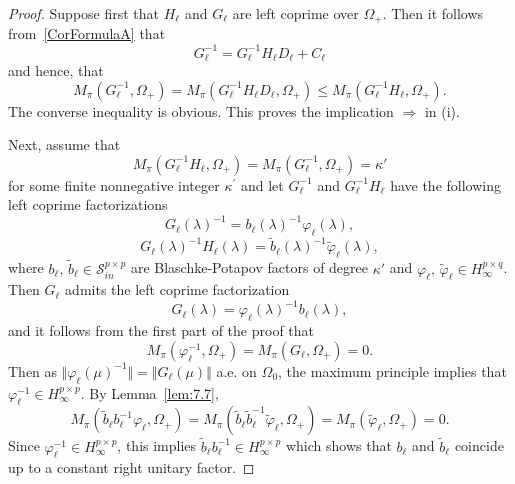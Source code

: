 \documentclass[12pt,twoside,a4paper]{amsart}
\theoremstyle{definition}
\numberwithin{equation}{section}
\begin{document}
\begin{proof}
Suppose first  that $H_\ell$ and $ G_\ell $ are left coprime over
$\Omega_+$. Then it follows from~\eqref{CorFormulaA} that
\[
G_\ell^{-1}= G_\ell^{-1} H_\ell D_\ell+ C_\ell
\]
and hence, that
\[
M_{\pi} (G_\ell^{-1}, \Omega_+)=M_\pi(G_\ell^{-1}H_\ell D_\ell, \Omega_+)\le M_{\pi}
(G_\ell^{-1}H_\ell, \Omega_+).
\]
The converse inequality is obvious. This proves the implication
$\Longrightarrow$ in (i).

Next, assume that
\[
M_{\pi} (G_\ell^{-1}H_\ell, \Omega_+)=M_{\pi} (G_\ell^{-1},
\Omega_+)=\kappa'
\]
for some finite nonnegative integer $\kappa^\prime$ and
let $ G_\ell^{-1}$ and $ G_\ell^{-1} H_\ell$ have the
following left coprime factorizations
\begin{equation}\label{eq:7.110a}
 G_\ell (\lambda)^{-1}=b_\ell(\lambda)^{-1}\varphi_\ell(\lambda),
\end{equation}
\begin{equation}\label{eq:7.110b}
 G_\ell (\lambda)^{-1}H_\ell(\lambda) ={{{\widetilde b} }}_\ell(\lambda)^{-1}{{{\widetilde \varphi} }}_\ell(\lambda),
\end{equation}
where $b_\ell,\,{{{\widetilde b} }}_\ell \in {\mathcal S}_{in}^{p\times p}$ are
Blaschke-Potapov factors of degree $\kappa'$ and $\varphi_\ell,\,
{{{\widetilde \varphi} }}_\ell \in H_{\infty}^{p\times q}$. Then $G_\ell$ admits
the left coprime factorization
\begin{equation}\label{eq:7.110c}
 G_\ell (\lambda)= \varphi_\ell (\lambda)^{-1}b_\ell(\lambda) ,
\end{equation}
and it follows from the first part of the proof that
\[
M_{\pi} (\varphi_\ell^{-1}, \Omega_+)=M_{\pi} (G_\ell,
\Omega_+)=0.
\]
Then as  $\Vert\varphi_\ell(\mu)^{-1}\Vert=\Vert G_\ell(\mu)\Vert$ a.e. on $\Omega_0$, the maximum principle  implies that $\varphi_\ell^{-1}\in H_\infty^{p\times p}$. By Lemma~\ref{lem:7.7}, \[
M_{\pi} ({{{\widetilde b} }}_\ell b_\ell^{-1}\varphi_\ell, \Omega_+)=M_{\pi}
({{{\widetilde b} }}_\ell {{{\widetilde b} }}_\ell^{-1}{{{\widetilde \varphi} }}_\ell, \Omega_+)=M_{\pi}
({{{\widetilde \varphi} }}_\ell, \Omega_+)=0.
\]
Since $\varphi_\ell^{-1}\in H_\infty^{p\times p}$, this implies ${{{\widetilde b} }}_\ell b_\ell^{-1}\in H_\infty^{p\times p}$ which shows that $b_\ell$ and $\widetilde{b}_\ell$ coincide up to a constant right unitary factor.


\end{proof}
\end{document}
